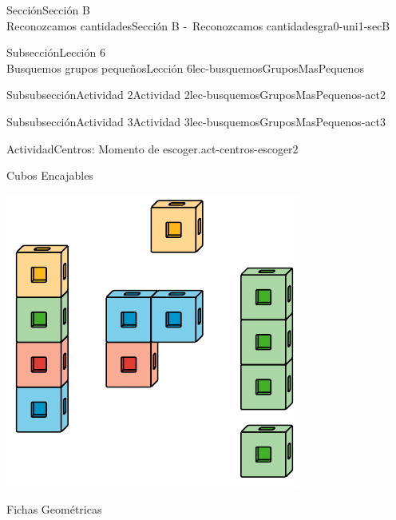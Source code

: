 \begin{sectionptx}{Sección}{{\Large Sección B\\}Reconozcamos cantidades}{}{Sección B -~Reconozcamos cantidades}{}{}{gra0-uni1-secB}
\begin{subsectionptx}{Subsección}{{\normalsize Lección 6\\[-0.05cm]}Busquemos grupos pequeños}{}{Lección 6}{}{}{lec-busquemosGruposMasPequenos}
\begin{subsubsectionptx}{Subsubsección}{Actividad 2}{}{Actividad 2}{}{}{lec-busquemosGruposMasPequenos-act2}
\end{subsubsectionptx}
%
%
\typeout{************************************************}
\typeout{************************************************}
%
\clearpage
\begin{subsubsectionptx}{Subsubsección}{Actividad 3}{}{Actividad 3}{}{}{lec-busquemosGruposMasPequenos-act3}
\begin{activity}{Actividad}{Centros: Momento de escoger.}{act-centros-escoger2}%
\begin{sidebyside}{2}{0.025}{0.025}{0.05}%
\begin{sbspanel}{0.45}%
Cubos Encajables%
\par
\includegraphics[max width=\linewidth, center]{external/svg-source/tikz-file-128850.pdf}
\end{sbspanel}%
\begin{sbspanel}{0.45}%
Fichas Geométricas%
\par

\end{sbspanel}
\end{sidebyside}
\end{activity}
\end{subsubsectionptx}
\end{subsectionptx}
\end{sectionptx}
